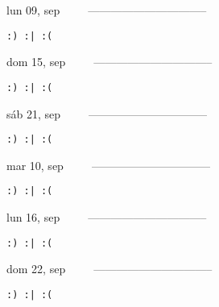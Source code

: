 \documentclass[letterpaper,10pt]{article}
\begin{document}
\begin{multicols}{3}
{lun 09, sep\ \ \ \ \ --------------------------------}
\begin{flushright}\begin{small}\texttt{:) :| :(}\end{small}\end{flushright}
\vfill
{dom 15, sep\ \ \ \ \ --------------------------------}
\begin{flushright}\begin{small}\texttt{:) :| :(}\end{small}\end{flushright}\par
\vfill
{sáb 21, sep\ \ \ \ \ --------------------------------}
\begin{flushright}\begin{small}\texttt{:) :| :(}\end{small}\end{flushright}\par
\vfill
\end{multicols}
\vspace{1.05cm}

\begin{multicols}{3}
{mar 10, sep\ \ \ \ \ --------------------------------}
\begin{flushright}\begin{small}\texttt{:) :| :(}\end{small}\end{flushright}
\vfill
{lun 16, sep\ \ \ \ \ --------------------------------}
\begin{flushright}\begin{small}\texttt{:) :| :(}\end{small}\end{flushright}\par
\vfill
{dom 22, sep\ \ \ \ \ --------------------------------}
\begin{flushright}\begin{small}\texttt{:) :| :(}\end{small}\end{flushright}\par
\vfill
\end{multicols}
\vspace{1.05cm}
\end{document}
